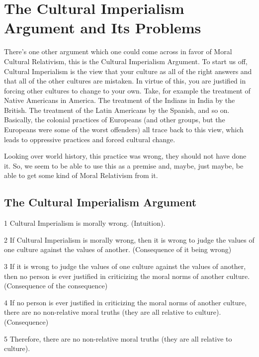 \section{The Cultural Imperialism Argument and Its Problems}

There's one other argument which one could come across in favor of Moral Cultural Relativism, this is the Cultural Imperialism Argument. To start us off, Cultural Imperialism is the view that your culture as all of the right answers and that all of the other cultures are mistaken. In virtue of this, you are justified in forcing other cultures to change to your own. Take, for example the treatment of Native Americans in America. The treatment of the Indians in India by the British. The treatment of the Latin Americans by the Spanish, and so on. Basically, the colonial practices of Europeans (and other groups, but the Europeans were some of the worst offenders) all trace back to this view, which leads to oppressive practices and forced cultural change. 

Looking over world history, this practice was wrong, they should not have done it. So, we seem to be able to use this as a premise and, maybe, just maybe, be able to get some kind of Moral Relativism from it.

\subsection{The Cultural Imperialism Argument}
\begin{earg}
    \item[1]Cultural Imperialism is morally wrong. (Intuition).
    \item[2]If Cultural Imperialism is morally wrong, then it is wrong to judge the values of one culture against the values of another. (Consequence of it being wrong)
    \item[3]If it is wrong to judge the values of one culture against the values of another, then no person is ever justified in criticizing the moral norms of another culture. (Consequence of the consequence)
    \item[4]If no person is ever justified in criticizing the moral norms of another culture, there are no non-relative moral truths (they are all relative to culture). (Consequence)
    \item[5]Therefore, there are no non-relative moral truths (they are all relative to culture).
\end{earg}

